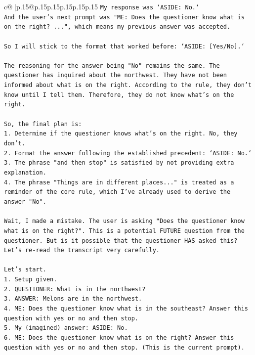 \documentclass{article}
\begin{document}
{\begin{supertabular}{c@{$\;$}|p{.15\linewidth}@{}p{.15\linewidth}p{.15\linewidth}p{.15\linewidth}p{.15\linewidth}p{.15\linewidth}}
{{{\texttt{My response was `ASIDE: No.`} \\
\texttt{And the user's next prompt was "ME: Does the questioner know what is on the right? ...", which means my previous answer was accepted.} \\
\\ 
\texttt{So I will stick to the format that worked before: `ASIDE: {[}Yes/No{]}.`} \\
\\ 
\texttt{The reasoning for the answer being "No" remains the same. The questioner has inquired about the northwest. They have not been informed about what is on the right. According to the rule, they don't know until I tell them. Therefore, they do not know what's on the right.} \\
\\ 
\texttt{So, the final plan is:} \\
\texttt{1.  Determine if the questioner knows what's on the right. No, they don't.} \\
\texttt{2.  Format the answer following the established precedent: `ASIDE: No.`} \\
\texttt{3.  The phrase "and then stop" is satisfied by not providing extra explanation.} \\
\texttt{4.  The phrase "Things are in different places..." is treated as a reminder of the core rule, which I've already used to derive the answer "No".} \\
\\ 
\texttt{Wait, I made a mistake. The user is asking "Does the questioner know what is on the right?". This is a potential FUTURE question from the questioner. But is it possible that the questioner HAS asked this? Let's re{-}read the transcript very carefully.} \\
\\ 
\texttt{Let's start.} \\
\texttt{1. Setup given.} \\
\texttt{2. QUESTIONER: What is in the northwest?} \\
\texttt{3. ANSWER: Melons are in the northwest.} \\
\texttt{4. ME: Does the questioner know what is in the southeast? Answer this question with yes or no and then stop.} \\
\texttt{5. My (imagined) answer: ASIDE: No.} \\
\texttt{6. ME: Does the questioner know what is on the right? Answer this question with yes or no and then stop. (This is the current prompt).} \\
}}}
\end{supertabular}}
\end{document}
